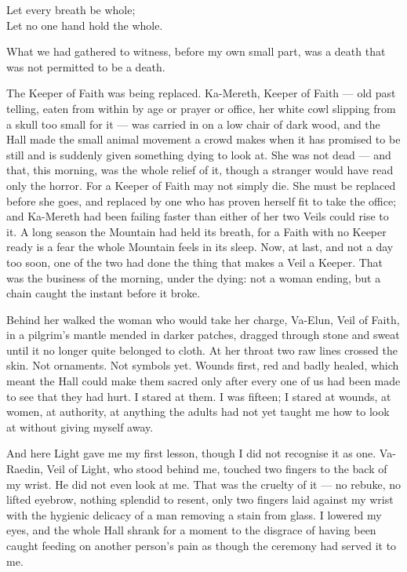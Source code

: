 \begin{scripture}
Let every breath be whole;\\
Let no one hand hold the whole.
\end{scripture}

\ornament

What we had gathered to witness, before my own small part, was a death that was not permitted to be a death.\par

The Keeper of Faith was being replaced. 
Ka-Mereth, Keeper of Faith --- old past telling, eaten from within by age or prayer or office, her white cowl slipping from a skull too small for it --- was carried in on a low 
chair of dark wood, and the Hall made the small animal movement a crowd makes when it has promised to be still and is suddenly given something dying to look at. 
She was not dead --- and that, this morning, was the whole relief of it, though a stranger would have read only the horror.
For a Keeper of Faith may not simply die.
She must be replaced before she goes, and replaced by one who has proven herself fit to take the office; 
and Ka-Mereth had been failing faster than either of her two Veils could rise to it.
A long season the Mountain had held its breath, for a Faith with no Keeper ready is a fear the whole Mountain feels in its sleep.
Now, at last, and not a day too soon, one of the two had done the thing that makes a Veil a Keeper.
That was the business of the morning, under the dying: not a woman ending, but a chain caught the instant before it broke.\par

Behind her walked the woman who would take her charge, Va-Elun, Veil of Faith, in a pilgrim's mantle mended in darker patches, dragged through stone and sweat until it 
no longer quite belonged to cloth. 
At her throat two raw lines crossed the skin. 
Not ornaments. 
Not symbols yet. 
Wounds first, red and badly healed, which meant the Hall could make them sacred only after every one of us had been made to see that they had hurt. 
I stared at them. 
I was fifteen; I stared at wounds, at women, at authority, at anything the adults had not yet taught me how to look at without giving myself away.\par

And here Light gave me my first lesson, though I did not recognise it as one. 
Va-Raedin, Veil of Light, who stood behind me, touched two fingers to the back of my wrist. 
He did not even look at me. 
That was the cruelty of it --- no rebuke, no lifted eyebrow, nothing splendid to resent, only two fingers laid against my wrist with the hygienic delicacy of a man removing 
a stain from glass. 
I lowered my eyes, and the whole Hall shrank for a moment to the disgrace of having been caught feeding on another person's pain as though the ceremony had served it to me.\par

